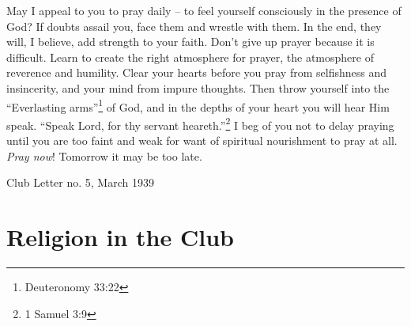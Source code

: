 \documentclass[14pt, article, extrafontsizes, twopage, a4paper]{memoir}
\newcommand{\attr}[1]{
  {\raggedleft\smaller#1

  }
}
\begin{document}
May I appeal to you to pray daily -- to feel yourself
consciously in the presence of God? If doubts assail you,
face them and wrestle with them. In the end, they will, I
believe, add strength to your faith. Don't give up prayer
because it is difficult. Learn to create the right atmosphere
for prayer, the atmosphere of reverence and humility.
Clear your hearts before you pray from selfishness and
insincerity, and your mind from impure thoughts. Then
throw yourself into the ``Everlasting arms''\footnote{Deuteronomy 33:22} of God, and in
the depths of your heart you will hear Him speak. ``Speak
Lord, for thy servant heareth.''\footnote{1 Samuel 3:9}
I beg of you not to delay
praying until you are too faint and weak for want of
spiritual nourishment to pray at all. \textsl{Pray now}! Tomorrow
it may be too late.

\attr{Club Letter no. 5, March 1939}

\chapter{Religion in the Club}
\end{document}
